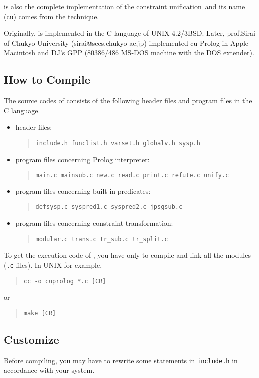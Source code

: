 \cuprolog is also the complete implementation of the constraint
unification\cite{cs:cu}\ and its name (cu) comes from the technique.

Originally, \cuprolog is implemented in the C language of UNIX
4.2/3BSD. Later, prof.Sirai of Chukyo-University
(sirai@sccs.chukyo-ac.jp) implemented cu-Prolog in Apple Macintosh and
DJ's GPP (80386/486 MS-DOS machine with the DOS extender).


\subsection{How to Compile \cuprolog}
The source codes of \cuprolog consists of the following header files
and program files in the C language.
\begin{itemize}
\item header files:
\begin{quote}
	{\tt include.h  funclist.h  varset.h globalv.h sysp.h}
\end{quote}
\item program files concerning Prolog interpreter:
\begin{quote}
	{\tt  	main.c  mainsub.c  new.c  read.c  print.c refute.c  unify.c}
\end{quote}
\item program files concerning built-in predicates:
\begin{quote}
	{\tt defsysp.c syspred1.c syspred2.c jpsgsub.c}
\end{quote}
\item program files concerning constraint transformation:
\begin{quote}
	{\tt modular.c trans.c tr\_sub.c tr\_split.c}
\end{quote}
\end{itemize}

To get the execution code of \cuprolog, 
you have only to compile and link 
all the modules ({\tt *.c} files). In UNIX for example, 
\begin{quote}
 	{\tt cc -o cuprolog *.c [CR]}
\end{quote}
or 
\begin{quote}
	{\tt make [CR]}
\end{quote}

\subsection{Customize}
Before compiling, you may have to rewrite some statements in 
{\tt include.h} in accordance with your system.

